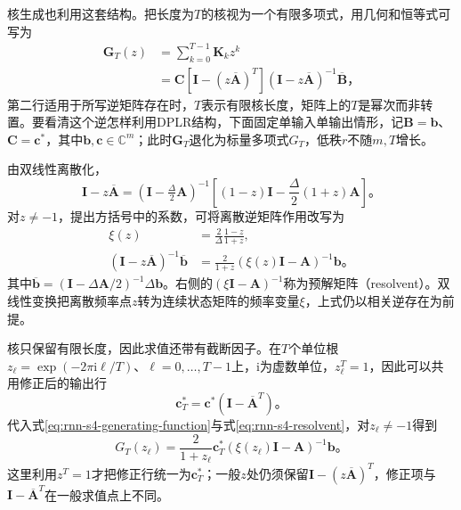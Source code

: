 核生成也利用这套结构。把长度为$T$的核视为一个有限多项式，用几何和恒等式可写为
\begin{equation}
  \begin{aligned}
    \bm{G}_T(z)&=\sum_{k=0}^{T-1}\bm{K}_k z^k\\
      &=\bm{C}\left[\bm{I}-(z\overline{\bm{A}})^T\right]
         (\bm{I}-z\overline{\bm{A}})^{-1}\overline{\bm{B}}\text{，}
  \end{aligned}
  \label{eq:rnn-s4-generating-function}
\end{equation}
第二行适用于所写逆矩阵存在时，$T$表示有限核长度，矩阵上的$T$是幂次而非转置。要看清这个逆怎样利用DPLR结构，下面固定单输入单输出情形，记$\bm B=\bm b$、$\bm C=\bm c^*$，其中$\bm b,\bm c\in\mathbb C^m$；此时$\bm G_T$退化为标量多项式$G_T$，低秩$r$不随$m,T$增长。

由双线性离散化，
\[
  \bm I-z\overline{\bm A}
    =(\bm I-\tfrac{\Delta}{2}\bm A)^{-1}
      \left[(1-z)\bm I-\frac{\Delta}{2}(1+z)\bm A\right]\text{。}
\]
对$z\neq-1$，提出方括号中的系数，可将离散逆矩阵作用改写为
\begin{equation}
  \begin{aligned}
    \xi(z)&=\frac{2}{\Delta}\frac{1-z}{1+z},\\
    (\bm I-z\overline{\bm A})^{-1}\overline{\bm b}
      &=\frac{2}{1+z}(\xi(z)\bm I-\bm A)^{-1}\bm b\text{。}
  \end{aligned}
  \label{eq:rnn-s4-resolvent}
\end{equation}
其中$\overline{\bm b}=(\bm I-\Delta\bm A/2)^{-1}\Delta\bm b$。右侧的$(\xi\bm I-\bm A)^{-1}$称为预解矩阵（resolvent）。双线性变换把离散频率点$z$转为连续状态矩阵的频率变量$\xi$，上式仍以相关逆存在为前提。

核只保留有限长度，因此求值还带有截断因子。在$T$个单位根
$z_\ell=\exp(-2\pi\mathrm i\ell/T)$、$\ell=0,\ldots,T-1$上，$\mathrm i$为虚数单位，$z_\ell^T=1$，因此可以共用修正后的输出行
\begin{equation}
  \bm c_T^*=\bm c^*(\bm I-\overline{\bm A}^{T})\text{。}
  \label{eq:rnn-s4-finite-readout}
\end{equation}
代入式\eqref{eq:rnn-s4-generating-function}与式\eqref{eq:rnn-s4-resolvent}，对$z_\ell\neq-1$得到
\begin{equation}
  G_T(z_\ell)=\frac{2}{1+z_\ell}
    \bm c_T^*(\xi(z_\ell)\bm I-\bm A)^{-1}\bm b\text{。}
  \label{eq:rnn-s4-root-evaluation}
\end{equation}
这里利用$z^T=1$才把修正行统一为$\bm c_T^*$；一般$z$处仍须保留$\bm I-(z\overline{\bm A})^T$，修正项与$\bm I-\overline{\bm A}^T$在一般求值点上不同。

